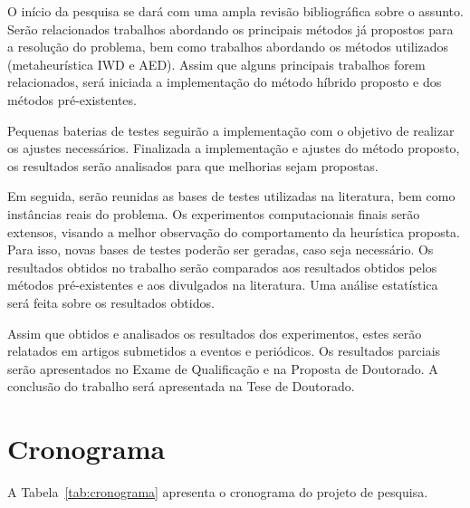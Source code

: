 \documentclass[brazil]{article}
\begin{document}
O início da pesquisa se dará com uma ampla revisão bibliográfica sobre o assunto.
Serão relacionados trabalhos abordando os principais métodos já propostos para a
resolução do problema, bem como trabalhos abordando os métodos utilizados (metaheurística IWD e AED).
Assim que alguns principais trabalhos forem relacionados, será iniciada
a implementação do método híbrido proposto e dos métodos pré-existentes.

Pequenas baterias de testes seguirão a implementação com o objetivo de
realizar os ajustes necessários.
Finalizada a implementação e ajustes do método proposto, os resultados
serão analisados para que melhorias sejam propostas.

Em seguida, serão reunidas as bases de testes utilizadas
na literatura, bem como instâncias reais do pro\-ble\-ma.
Os experimentos computacionais finais serão extensos, visando a me\-lhor observação
do comportamento da heurística proposta.
Para isso, novas bases de testes poderão ser geradas, caso seja necessário.
Os resultados obtidos no trabalho serão comparados aos resultados obtidos pelos métodos
pré-existentes e aos divulgados na literatura.
Uma análise estatística será feita sobre os resultados obtidos.

Assim que obtidos e analisados os resultados dos experimentos, estes serão
relatados em artigos submetidos a eventos e periódicos.
Os resultados parciais serão apresentados no Exame de Qualificação e na
Proposta de Doutorado.
A conclusão do trabalho será apresentada na Tese de Doutorado.

\section{Cronograma}
\label{sec:cronograma}

A Tabela~\ref{tab:cronograma} apresenta o cronograma do projeto de pesquisa.
\end{document}
